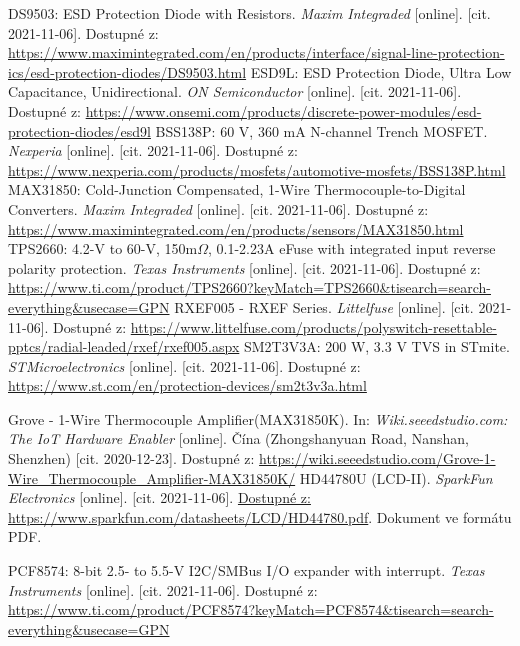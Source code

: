 \begin{thebibliography}{3}
DS9503: ESD Protection Diode with Resistors. \textit{Maxim Integraded} [online]. [cit. 2021-11-06]. Dostupné z: \url{https://www.maximintegrated.com/en/products/interface/signal-line-protection-ics/esd-protection-diodes/DS9503.html}
ESD9L: ESD Protection Diode, Ultra Low Capacitance, Unidirectional. \textit{ON Semiconductor} [online]. [cit. 2021-11-06]. Dostupné z: \url{https://www.onsemi.com/products/discrete-power-modules/esd-protection-diodes/esd9l}
BSS138P: 60 V, 360 mA N-channel Trench MOSFET. \textit{Nexperia} [online]. [cit. 2021-11-06]. Dostupné z: \url{https://www.nexperia.com/products/mosfets/automotive-mosfets/BSS138P.html}
MAX31850: Cold-Junction Compensated, 1-Wire Thermocouple-to-Digital Converters. \textit{Maxim Integraded} [online]. [cit. 2021-11-06]. Dostupné z: \url{https://www.maximintegrated.com/en/products/sensors/MAX31850.html}
TPS2660: 4.2-V to 60-V, 150m$\Omega$, 0.1-2.23A eFuse with integrated input reverse polarity protection. \textit{Texas Instruments} [online]. [cit. 2021-11-06]. Dostupné z: \url{https://www.ti.com/product/TPS2660?keyMatch=TPS2660&tisearch=search-everything&usecase=GPN}
RXEF005 - RXEF Series. \textit{Littelfuse} [online]. [cit. 2021-11-06]. Dostupné z: \url{https://www.littelfuse.com/products/polyswitch-resettable-pptcs/radial-leaded/rxef/rxef005.aspx}
SM2T3V3A: 200 W, 3.3 V TVS in STmite. \textit{STMicroelectronics} [online]. [cit. 2021-11-06]. Dostupné z: \url{https://www.st.com/en/protection-devices/sm2t3v3a.html}

Grove - 1-Wire Thermocouple Amplifier(MAX31850K). In: \textit{Wiki.seeedstudio.com: The IoT Hardware Enabler} [online]. Čína (Zhongshanyuan Road, Nanshan, Shenzhen) [cit. 2020-12-23]. Dostupné z: \url{https://wiki.seeedstudio.com/Grove-1-Wire\_Thermocouple\_Amplifier-MAX31850K/}
HD44780U (LCD-II). \textit{SparkFun Electronics} [online]. [cit. 2021-11-06]. \url{Dostupné z: https://www.sparkfun.com/datasheets/LCD/HD44780.pdf}. Dokument ve formátu PDF.

PCF8574: 8-bit 2.5- to 5.5-V I2C/SMBus I/O expander with interrupt. \textit{Texas Instruments} [online]. [cit. 2021-11-06]. Dostupné z: \url{https://www.ti.com/product/PCF8574?keyMatch=PCF8574&tisearch=search-everything&usecase=GPN}


\end{thebibliography}
